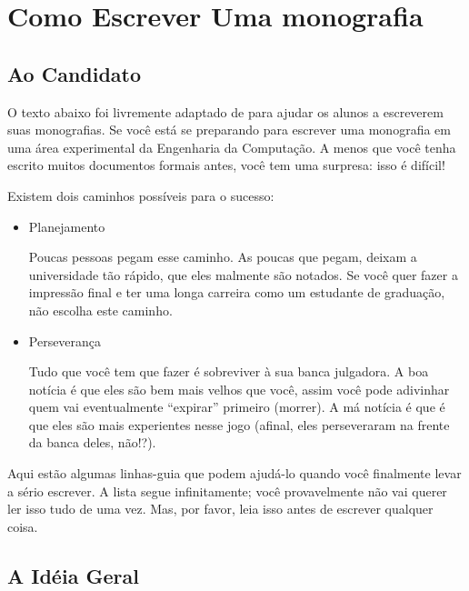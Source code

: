 \chapter {Como Escrever Uma monografia} \label{cap:comoEscrever}

\section{Ao Candidato}

O texto abaixo foi livremente adaptado de \cite{COMER2010} para ajudar os alunos a escreverem suas monografias.
Se você est\'{a} se preparando para escrever uma monografia em uma \'{a}rea experimental da Engenharia da Computa\c{c}\~{a}o. 
A menos que você tenha escrito muitos documentos formais antes, você tem uma surpresa: isso \'{e} dif\'{i}cil!

Existem dois caminhos poss\'{i}veis para o sucesso:

\begin{itemize}
	\item Planejamento
	
	Poucas pessoas pegam esse caminho. As poucas que pegam, deixam a universidade t\~{a}o r\'{a}pido, 
	que eles malmente s\~{a}o notados. Se você quer fazer a impress\~{a}o final e ter uma longa carreira como um 
	estudante de gradua\c{c}\~{a}o, n\~{a}o escolha este caminho.
	
	\item Perseveran\c{c}a
	
	Tudo que você tem que fazer \'{e} sobreviver à sua banca julgadora. 
	A boa not\'{i}cia \'{e} que eles s\~{a}o bem mais velhos que você, assim você pode adivinhar quem vai eventualmente 
	``expirar''  primeiro (morrer).
	A m\'{a} not\'{i}cia \'{e} que \'{e} que eles s\~{a}o mais experientes nesse jogo (afinal, eles perseveraram na frente da banca deles, n\~{a}o!?).
	
\end{itemize}
	
Aqui est\~{a}o algumas linhas-guia que podem ajud\'{a}-lo quando você finalmente levar a s\'{e}rio escrever. 
A lista segue infinitamente; você provavelmente n\~{a}o vai querer ler isso tudo de uma vez. Mas, por favor, leia isso antes de 
escrever qualquer coisa.

\hfill

\section{A Id\'{e}ia Geral}	

